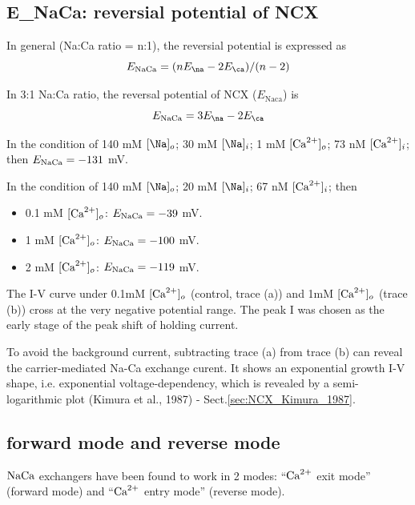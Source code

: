 \subsection{E\_NaCa: reversial potential of NCX}
\label{sec:NCX-reversial-potential}

In general (Na:Ca ratio = n:1), the reversial potential is expressed as
\begin{equation}
E_\NaCa = (n E_\na - 2 E_\ca) / (n-2)
\end{equation}

In 3:1 Na:Ca ratio, the reversal potential of NCX ($E_\text{Naca}$) is
\begin{equation}
E_\NaCa = 3 E_\na - 2 E_\ca
\end{equation}

In the condition of 140 mM $[\Na]_o$; 30 mM $[\Na]_i$; 1 mM $[{\text{Ca}^{2+}}]_o$; 73 nM
$[{\text{Ca}^{2+}}]_i$; then $E_{\text{NaCa}} = -131$ mV.

In the condition of 140 mM $[\Na]_o$; 20 mM $[\Na]_i$; 67 nM
$[{\text{Ca}^{2+}}]_i$; then 
\begin{itemize}
  
  \item 0.1 mM $[{\text{Ca}^{2+}}]_o$: $E_{\text{NaCa}} = -39$ mV.
  
  \item 1 mM $[{\text{Ca}^{2+}}]_o$: $E_{\text{NaCa}} = -100$ mV.
  
  \item 2 mM $[{\text{Ca}^{2+}}]_o$: $E_{\text{NaCa}} = -119$ mV.
\end{itemize}

The I-V curve under 0.1mM $[{\text{Ca}^{2+}}]_o$ (control, trace (a)) and 1mM $[{\text{Ca}^{2+}}]_o$
(trace (b)) cross at the very negative potential range. The peak I was chosen as
the early stage of the peak shift of holding current. 

To avoid the background current, subtracting trace (a) from trace (b) can reveal
the carrier-mediated Na-Ca exchange curent. It shows an exponential growth I-V shape, i.e.
exponential voltage-dependency, which is revealed by a semi-logarithmic plot
(Kimura et al., 1987) - Sect.\ref{sec:NCX_Kimura_1987}.





\subsection{forward mode and reverse mode}
\label{sec:NCX-forward-mode}
\label{sec:NCX-reverse-mode}

${\text{NaCa}}$ exchangers have been found to work in 2 modes: ``${\text{Ca}^{2+}}$ exit
mode'' (forward mode) and ``${\text{Ca}^{2+}}$ entry mode'' (reverse mode). 

